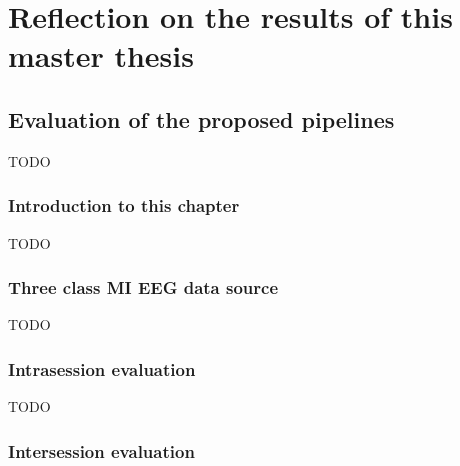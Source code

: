 


\part{Reflection on the results of this master thesis}
\label{part:reflection}

\chapter{Evaluation of the proposed pipelines}
\label{ch:evaluation}
TODO

\section{Introduction to this chapter}
\label{sec:evaluation_introduction}

TODO

\section{Three class MI EEG data source}
\label{sec:evaluation_data_source}


TODO

\section{Intrasession evaluation}
\label{sec:evaluation_intrasession}


TODO

\section{Intersession evaluation}
\label{sec:evaluation_intersession}



